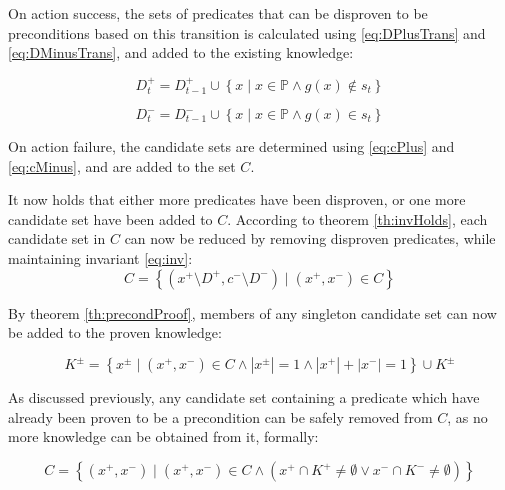 \documentclass[../Master.tex]{subfiles}
\begin{document}
On action success, the sets of predicates that can be disproven to be preconditions based on this transition is calculated using \eqref{eq:DPlusTrans} and \eqref{eq:DMinusTrans}, and added to the existing knowledge:

\begin{equation*}
    D_t^+ = D_{t-1}^+ \cup \left\{ x \; | \; x \in \mathbb{P} \land g(x) \notin s_t \right\}
\end{equation*}

\begin{equation*}
    D_t^- = D_{t-1}^- \cup \left\{ x \; | \; x \in \mathbb{P} \land g(x) \in s_t \right\}
\end{equation*}

On action failure, the candidate sets are determined using \eqref{eq:cPlus} and \eqref{eq:cMinus}, and are added to the set $C$.

It now holds that either more predicates have been disproven, or one more candidate set have been added to $C$. According to theorem \ref{th:invHolds}, each candidate set in $C$ can now be reduced by removing disproven predicates, while maintaining invariant \eqref{eq:inv}:
\begin{equation} \label{reduceCands}
    C = \left\{ \left( x^+ \setminus D^+, c^- \setminus D^- \right)
            \; | \; \left( x^+, x^- \right) \in C
        \right\}
\end{equation}

By theorem \ref{th:precondProof}, members of any singleton candidate set can now be added to the proven knowledge:

\begin{equation} \label{eq:extractKnown}
    K^{\pm} = \left\{
        x^{\pm} \; | \; \left( x^+, x^- \right) \in C \land
        \left| x^{\pm} \right| = 1 \land
        \left|  x^+ \right| + \left| x^- \right| = 1
    \right\}
    \cup K^{\pm}
\end{equation}

As discussed previously, any candidate set containing a predicate which have already been proven to be a precondition can be safely removed from $C$, as no more knowledge can be obtained from it, formally:

\begin{equation} \label{eq:removeKnown}
    C = \left\{
        \left( x^+, x^- \right) \; | \;
        \left( x^+, x^- \right) \in C \land
        \left(
            x^+ \cap K^+ \neq \emptyset \lor x^- \cap K^- \neq \emptyset
        \right)
    \right\}
\end{equation}
\end{document}
